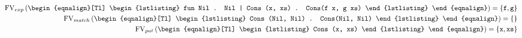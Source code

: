 \begin{example}
\label{ex:free-variables1}
\begin{eqnarray*}[c]
  \FV_{exp} \left(
    \begin{eqnalign}[Tl]
\begin{lstlisting}
fun Nil . Nil
  | Cons (x, xs) . Cons(f x, g xs)
\end{lstlisting}
    \end{eqnalign}
  \right) = \{\ttt{f}, \ttt{g} \} \\
%
  \FV_{match} \left( 
    \begin{eqnalign}[Tl]
\begin{lstlisting}
Cons (Nil, Nil) . Cons(Nil, Nil)
\end{lstlisting}
    \end{eqnalign}
  \right) = \{\} \\
%
  \FV_{pat} \left( 
    \begin{eqnalign}[Tl]
\begin{lstlisting}
Cons (x, xs)
\end{lstlisting}
    \end{eqnalign}
  \right) = \{\ttt{x}, \ttt{xs}\} \\
\end{eqnarray*}
\end{example}


